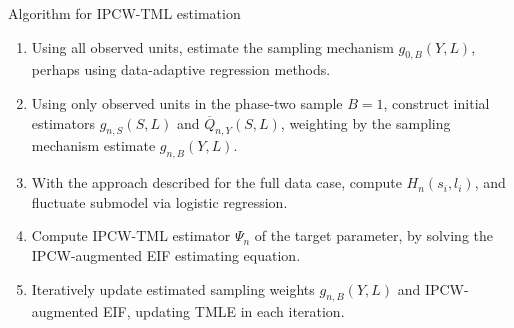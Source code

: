 \documentclass{beamer}
\begin{document}
\begin{frame}[c]{Algorithm for IPCW-TML estimation}

\begin{center}
\begin{enumerate}\label{ipcwtmle_algo}
  \itemsep8pt
  \item Using all observed units, estimate the sampling mechanism
    $g_{0,B}(Y, L)$, perhaps using data-adaptive regression methods.
  \item Using only observed units in the phase-two sample $B = 1$,
    construct initial estimators $g_{n,S}(S,L)$ and $\overline{Q}_{n,Y}(S,L)$,
    weighting by the sampling mechanism estimate $g_{n,B}(Y,L)$.
  \item With the approach described for the full data case, compute
    $H_n(s_i,l_i)$, and fluctuate submodel via logistic regression.
  \item Compute IPCW-TML estimator $\Psi_n$ of the target parameter, by solving
    the IPCW-augmented EIF estimating equation.
  \item Iteratively update estimated sampling weights $g_{n,B}(Y,L)$ and
    IPCW-augmented EIF, updating TMLE in each iteration.
\end{enumerate}
\end{center}


\end{frame}


\setbeamercovered{}
\beamerdefaultoverlayspecification{}

\begin{frame}[c,allowframebreaks]{}

\tiny



\end{frame}
\end{document}
